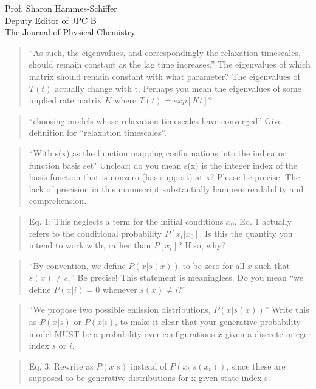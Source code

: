 \documentclass{letter}
\begin{document}
\begin{letter}{Prof. Sharon Hammes-Schiffer \\ Deputy Editor of JPC B \\ The Journal of Physical Chemistry}
\begin{quote}
``As such, the eigenvalues, and correspondingly the relaxation timescales, should remain constant as the lag time increases.''  The eigenvalues of which matrix should remain constant with what parameter?  The eigenvalues of $T(t)$ actually change with t.  Perhaps you mean the eigenvalues of some implied rate matrix $K$ where $T(t) = exp[Kt]$?
\end{quote}

\begin{quote}
``choosing models whose relaxation timescales have converged''  Give definition for ``relaxation timescales''.
\end{quote}

\begin{quote}
``With s(x) as the function mapping conformations into the indicator function basis set" Unclear: do you mean s(x) is the integer index of the basis function that is nonzero (has support) at x?  Please be precise.  The lack of precision in this manuscript substantially hampers readability and comprehension.
\end{quote}

\begin{quote}
Eq. 1: This neglects a term for the initial conditions $x_0$.  Eq. 1 actually refers to the conditional probability $P[{x_t}|x_0]$.  Is this the quantity you intend to work with, rather than $P[{x_t}]$?  If so, why?
\end{quote}

\begin{quote}
``By convention, we define $P(x | s(x))$ to be zero for all $x$ such that $s(x) \ne s_i$'' Be precise!  This statement is meaningless.  Do you mean ``we define $P(x | i) = 0$ whenever $s(x)\ne i$?''
\end{quote}

\begin{quote}
``We propose two possible emission distributions, $P(x | s(x))$''  Write this as $P(x | s)$ or $P(x | i)$, to make it clear that your generative probability model MUST be a probability over configurations $x$ given a discrete integer index $s$ or $i$.
\end{quote}

\begin{quote}
Eq. 3: Rewrite as $P(x|s)$ instead of $P(x_t|s(x_t))$, since these are supposed to be generative distributions for x given state index s.
\end{quote}


\end{letter}
\end{document}
